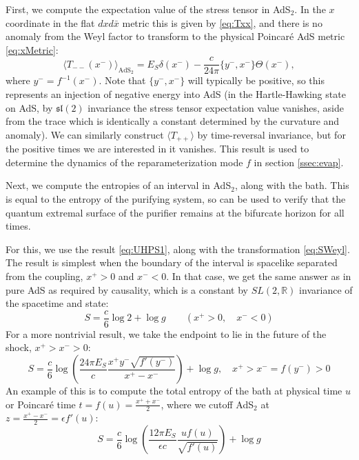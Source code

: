 \documentclass[12pt]{article}
\newcommand{\RR}{\mathbb{R}}
\renewcommand{\sl}{\mathfrak{sl}(2)}
\begin{document}
First, we compute the expectation value of the stress tensor in AdS$_2$. In the $x$ coordinate in the flat $dxd\bar{x}$ metric this is given by \eqref{eq:Txx}, and there is no anomaly from the Weyl factor to transform to the physical Poincar\'e AdS metric \eqref{eq:xMetric}:
\begin{equation}\label{eq:T--AdS}
	 \langle T_{--}(x^-)\rangle_{\text{AdS}_2} = E_S \delta(x^-)-\frac{c}{24\pi}\{y^-,x^-\}\Theta(x^-),
\end{equation}
where $y^- =f^{-1}(x^-)$. Note that $\{y^-,x^-\}$ will typically be positive, so this represents an injection of negative energy into AdS (in the Hartle-Hawking state on AdS, by $\sl$ invariance the stress tensor expectation value vanishes, aside from the trace which is identically a constant determined by the curvature and anomaly). We can similarly construct $\langle T_{++}\rangle$ by time-reversal invariance, but for the positive times we are interested in it vanishes. This result is used to determine the dynamics of the reparameterization mode $f$ in section \ref{ssec:evap}.

Next, we compute the entropies of an interval in AdS$_2$, along with the bath. This is equal to the entropy of the purifying system, so can be used to verify that the quantum extremal surface of the purifier remains at the bifurcate horizon for all times.

For this, we use the result \eqref{eq:UHPS1}, along with the transformation \eqref{eq:SWeyl}. The result is simplest when the boundary of the interval is spacelike separated from the coupling, $x^+>0$ and $x^-<0$. In that case, we get the same answer as in pure AdS as required by causality, which is a constant by $SL(2,\RR)$ invariance of the spacetime and state:
\begin{equation}\label{eq:constantentropy}
	S = \frac{c}{6} \log 2 + \log g \qquad (x^+>0, \quad x^-<0)
\end{equation}
For a more nontrivial result, we take the endpoint to lie in the future of the shock, $x^+>x^->0$:
\begin{equation}
	S = \frac{c}{6}\log \left(\frac{24\pi E_S}{c}\frac{x^+ y^- \sqrt{f'(y^-)}}{x^+ - x^-}\right) + \log g,\quad x^+>x^-=f(y^-)>0
\end{equation}
An example of this is to compute the total entropy of the bath at physical time $u$ or Poincar\'e time $t=f(u)=\frac{x^++x^-}{2}$, where we cutoff AdS$_2$ at $z=\frac{x^+-x^-}{2} = \epsilon f'(u)$:
\begin{equation}\label{eq:bathS}
	S = \frac{c}{6}\log \left(\frac{12\pi E_S}{\epsilon c}  \frac{u f(u)}{\sqrt{f'(u)}}\right) + \log g
\end{equation}
\end{document}
